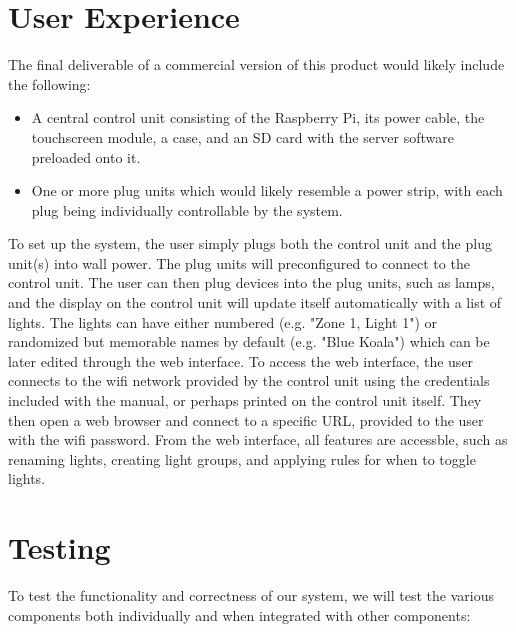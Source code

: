 \documentclass[oneside,openright]{book}
\begin{document}
\section{User Experience}

The final deliverable of a commercial version of this product would likely
include the following:

\begin{itemize}
    \item A central control unit consisting of the Raspberry Pi, its power
        cable, the touchscreen module, a case, and an SD card with the server
        software preloaded onto it.
    \item One or more plug units which would likely resemble a power strip,
        with each plug being individually controllable by the system.
\end{itemize}

To set up the system, the user simply plugs both the control unit and the plug
unit(s) into wall power.  The plug units will preconfigured to connect to the
control unit.  The user can then plug devices into the plug units, such as
lamps, and the display on the control unit will update itself automatically
with a list of lights.  The lights can have either numbered (e.g. "Zone 1,
Light 1") or randomized but memorable names by default (e.g. "Blue Koala")
which can be later edited through the web interface.  To access the web
interface, the user connects to the wifi network provided by the control unit
using the credentials included with the manual, or perhaps printed on the
control unit itself.  They then open a web browser and connect to a specific
URL, provided to the user with the wifi password.  From the web interface, all
features are accessble, such as renaming lights, creating light groups, and
applying rules for when to toggle lights.

\section{Testing}

To test the functionality and correctness of our system, we will test the
various components both individually and when integrated with other components:
\end{document}
